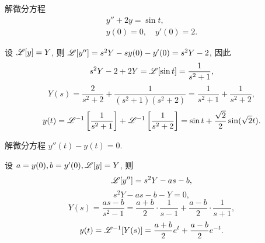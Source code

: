\begin{example}
	解微分方程
	\begin{align*}
		y''+2y=\sin t,\\
		y(0)=0,\quad y'(0)=2.
	\end{align*}
\end{example}
\begin{solution}
	设 $\mathscr{L}[y]=Y$, 则 $\mathscr{L}[y'']=s^2Y-sy(0)-y'(0)=s^2Y-2$, 因此
		\[s^2Y-2+2Y=\mathscr{L}[\sin t]=\frac{1}{s^2+1},\]
		\[Y(s)=\frac{2}{s^2+2}+\frac{1}{(s^2+1)(s^2+2)}=\frac{1}{s^2+1}+\frac{1}{s^2+2},\]
		\[y(t)=\mathscr{L}^{-1}\left[\frac{1}{s^2+1}\right]+\mathscr{L}^{-1}\left[\frac{1}{s^2+2}\right]
		=\sin t+\frac{\sqrt 2}2\sin(\sqrt 2 t). \]
\end{solution}

\begin{example}
	解微分方程 $y''(t)-y(t)=0$.
\end{example}
\begin{solution}
	设 $a=y(0),b=y'(0),\mathscr{L}[y]=Y$, 则
		\[\mathscr{L}[y'']=s^2Y-as-b,\]
		\[s^2Y-as-b-Y=0,\]
		\[Y(s)=\frac{as-b}{s^2-1}=\frac{a+b}2\cdot\frac1{s-1}+\frac{a-b}2\cdot\frac1{s+1},\]
		\[y(t)=\mathscr{L}^{-1}[Y(s)]=\frac{a+b}2e^t+\frac{a-b}2e^{-t}.\]
\end{solution}

